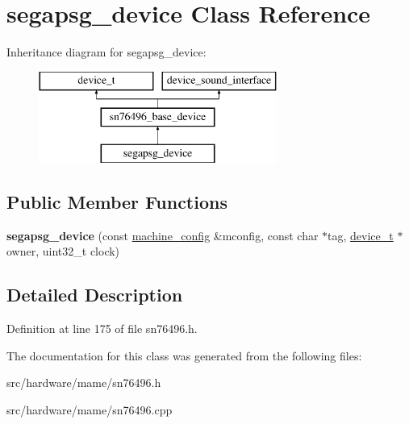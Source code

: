 \hypertarget{classsegapsg__device}{\section{segapsg\-\_\-device Class Reference}
\label{classsegapsg__device}
}
Inheritance diagram for segapsg\-\_\-device\-:\begin{figure}[H]
\begin{center}
\leavevmode
\includegraphics[height=3.000000cm]{classsegapsg__device}
\end{center}
\end{figure}
\subsection*{Public Member Functions}
\begin{DoxyCompactItemize}
\item 
\hypertarget{classsegapsg__device_a5cced95a11acdb89f8d9fd624feb93e3}{{\bfseries segapsg\-\_\-device} (const \hyperlink{structmachine__config}{machine\-\_\-config} \&mconfig, const char $\ast$tag, \hyperlink{classdevice__t}{device\-\_\-t} $\ast$owner, uint32\-\_\-t clock)}\label{classsegapsg__device_a5cced95a11acdb89f8d9fd624feb93e3}

\end{DoxyCompactItemize}


\subsection{Detailed Description}


Definition at line 175 of file sn76496.\-h.



The documentation for this class was generated from the following files\-:\begin{DoxyCompactItemize}
\item 
src/hardware/mame/sn76496.\-h\item 
src/hardware/mame/sn76496.\-cpp\end{DoxyCompactItemize}
